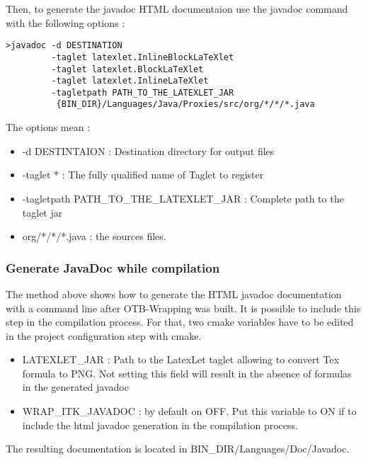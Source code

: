 Then, to generate the javadoc HTML documentaion use the javadoc command with the following options : 

\begin{verbatim}
>javadoc -d DESTINATION 
         -taglet latexlet.InlineBlockLaTeXlet 
         -taglet latexlet.BlockLaTeXlet 
         -taglet latexlet.InlineLaTeXlet 
         -tagletpath PATH_TO_THE_LATEXLET_JAR   
          {BIN_DIR}/Languages/Java/Proxies/src/org/*/*/*.java
\end{verbatim}

The options mean :
\begin{itemize}
\item -d DESTINTAION : Destination directory for output files
\item -taglet *      : The fully qualified name of Taglet to register
\item -tagletpath PATH\_TO\_THE\_LATEXLET\_JAR : Complete path to the taglet jar
\item org/*/*/*.java : the sources files. 
\end{itemize}


\subsubsection{Generate JavaDoc while compilation}
The method above shows how to generate the HTML javadoc documentation with 
a command line after OTB-Wrapping was built. It is possible to include this step 
in the compilation process. 
For that, two cmake variables have to be edited in the project configuration step with cmake.
\begin{itemize}
\item  LATEXLET\_JAR : Path to the LatexLet taglet allowing to convert Tex formula to PNG. 
       Not setting this field will result in the absence of formulas in the generated javadoc
\item  WRAP\_ITK\_JAVADOC : by default on OFF. Put this variable to ON if to include the html javadoc generation 
       in the compilation process.
\end{itemize}

The resulting documentation is located in BIN\_DIR/Languages/Doc/Javadoc.



